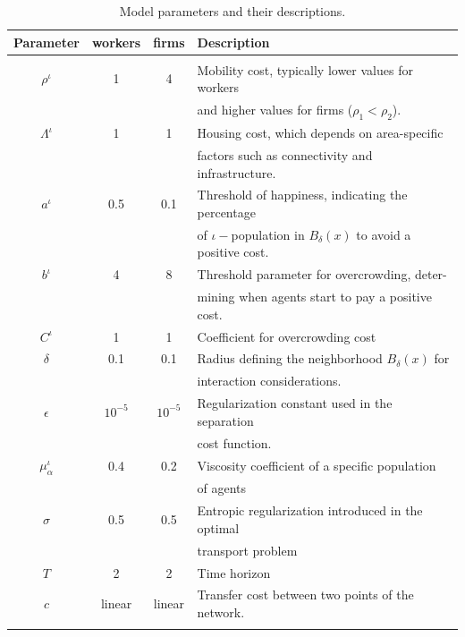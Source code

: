 \documentclass[smallextended,referee,envcountsect,]{svjour3}
\begin{document}
\begin{table}[H]
    \centering
  
    \begin{tabular}{|c|c|c|l|}
        \hline
        \textbf{Parameter} & \textbf{workers}  & \textbf{firms} & \textbf{Description} \\
        \hline
        & & & \\
        $\rho^\iota$ & 1 & 4 & Mobility cost, typically lower values for workers \\ 
         & & &  and  higher values for firms ($\rho_1 < \rho_2$). \\
        $\Lambda^\iota$ & 1 & 1 & Housing cost, which depends on area-specific   \\
        & & &  factors such as connectivity and infrastructure. \\
        $a^\iota$ & 0.5 & 0.1 & Threshold of happiness, indicating the percentage   \\
        & & &   of $\iota-$population in $B_\delta(x)$ to avoid a positive cost. \\
        $b^\iota$ & 4 & 8 & Threshold parameter for overcrowding, deter-  \\
        & & & mining when  agents start  to pay a positive cost. \\
        $C^\iota$ & 1 & 1 & Coefficient for overcrowding cost\\
         $\delta$ & 0.1 & 0.1 & Radius defining the neighborhood $B_\delta(x)$ for \\
        & & &  interaction considerations.\\
        $\epsilon$ & $10^{-5}$  & $10^{-5}$  & Regularization constant used in the separation \\
        & & & cost function. \\
        $\mu^\iota_\alpha$   & 0.4         & 0.2       & Viscosity coefficient of a specific population \\
           & & & of agents  \\
        $\sigma$         & 0.5         & 0.5       & Entropic regularization introduced in the optimal\\
        & & &  transport problem \\
        $T$              & 2           & 2         & Time horizon\\
        $c$ & linear & linear & Transfer cost between two points of the network.\\
        & & & \\
        \hline
    \end{tabular}
    \caption{Model parameters and their descriptions.}
    \label{tab:my-table}
\end{table}
\end{document}
